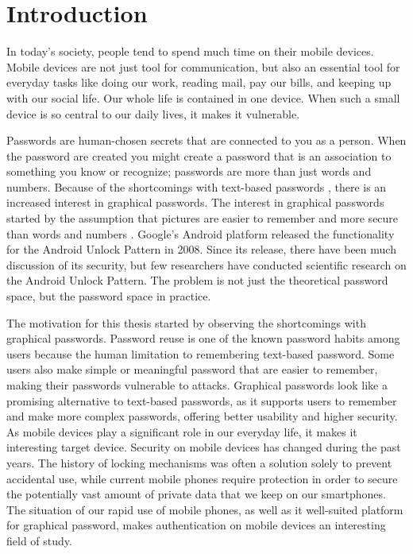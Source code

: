\chapter{Introduction}

  In today's society, people tend to spend much time on their mobile devices. Mobile devices are not just tool for communication, but also an essential tool for everyday tasks like doing our work, reading mail, pay our bills, and keeping up with our social life. Our whole life is contained in one device. When such a small device is so central to our daily lives, it makes it vulnerable.

  Passwords are human-chosen secrets that are connected to you as a person. When the password are created you might create a password that is an association to something you know or recognize; passwords are more than just words and numbers. Because of the shortcomings with text-based passwords \cite{UnixPasswords}, there is an increased interest in graphical passwords. The interest in graphical passwords started by the assumption that pictures are easier to remember and more secure than words and numbers \cite{DeAngeli}. Google's Android platform released the functionality for the Android Unlock Pattern in 2008. Since its release, there have been much discussion of its security, but few researchers have conducted scientific research on the Android Unlock Pattern. The problem is not just the theoretical password space, but the password space in practice.

  The motivation for this thesis started by observing the shortcomings with graphical passwords. Password reuse is one of the known password habits among users because the human limitation to remembering text-based password. Some users also make simple or meaningful password that are easier to remember, making their passwords vulnerable to attacks. Graphical passwords look like a promising alternative to text-based passwords, as it supports users to remember and make more complex passwords, offering better usability and higher security. As mobile devices play a significant role in our everyday life, it makes it interesting target device. Security on mobile devices has changed during the past years. The history of locking mechanisms was often a solution solely to prevent accidental use, while current mobile phones require protection in order to secure the potentially vast amount of private data that we keep on our smartphones. The situation of our rapid use of mobile phones, as well as it well-suited platform for graphical password, makes authentication on mobile devices an interesting field of study.

